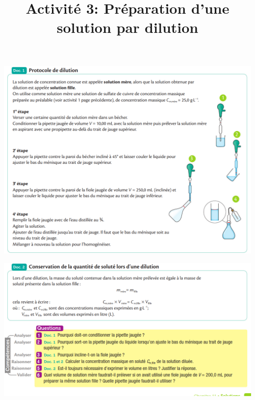 \documentclass[10pt]{article}
\newcommand{\myscale}{0.5}
\newcommand{\titreActivite}{\huge Activité 3: Préparation d'une solution par dilution} %
\begin{document}
\date{}
\title{\titreActivite}
\maketitle %



\begin{center}

	\includegraphics[scale=\myscale]{assets/d1.png}

	\includegraphics[scale=\myscale]{assets/d2q.png}



\end{center}
\end{document}

